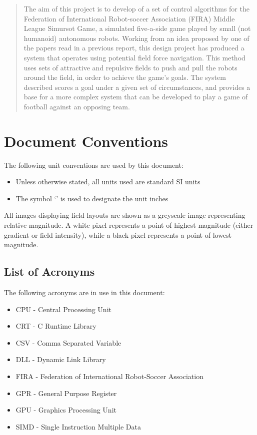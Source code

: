 
\begin{abstract}

The aim of this project is to develop of a set of control algorithms for the
Federation of International Robot-soccer Association (FIRA) Middle League
Simursot Game, a simulated five-a-side game played by small (not humanoid)
autonomous robots.  Working from an idea proposed by one of the papers read in a
previous report, this design project has produced a system that operates using
potential field force navigation.  This method uses sets of attractive and
repulsive fields to push and pull the robots around the field, in order to
achieve the game's goals.  The system described scores a goal under a given set
of circumstances, and provides a base for a more complex system that can be
developed to play a game of football against an opposing team.

\end{abstract}

\tableofcontents

\listoffigures

\section*{Document Conventions}
The following unit conventions are used by this document:

\begin{itemize}
  \item Unless otherwise stated, all units used are standard SI units
  \item The symbol `\si{\inch}' is used to designate the unit inches
\end{itemize}

All images displaying field layouts are shown as a greyscale image representing
relative magnitude.  A white pixel represents a point of highest magnitude
(either gradient or field intensity), while a black pixel represents a point of
lowest magnitude.

\subsection*{List of Acronyms}

The following acronyms are in use in this document:

\begin{itemize}
  \item CPU - Central Processing Unit
  \item CRT - C Runtime Library
  \item CSV - Comma Separated Variable
  \item DLL - Dynamic Link Library
  \item FIRA - Federation of International Robot-Soccer Association
  \item GPR - General Purpose Register
  \item GPU - Graphics Processing Unit
  \item SIMD - Single Instruction Multiple Data
\end{itemize}

